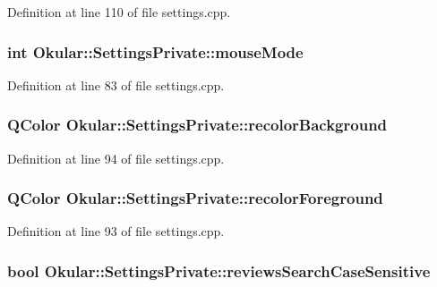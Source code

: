 Definition at line 110 of file settings.\+cpp.

\hypertarget{classOkular_1_1SettingsPrivate_a38b266f564e758f5a0634b3e56f4d7d6}{
\subsubsection[{mouse\+Mode}]{\setlength{\rightskip}{0pt plus 5cm}int Okular\+::\+Settings\+Private\+::mouse\+Mode}}\label{classOkular_1_1SettingsPrivate_a38b266f564e758f5a0634b3e56f4d7d6}


Definition at line 83 of file settings.\+cpp.

\hypertarget{classOkular_1_1SettingsPrivate_a4b7f7ebb712481217604970532e988f1}{
\subsubsection[{recolor\+Background}]{\setlength{\rightskip}{0pt plus 5cm}Q\+Color Okular\+::\+Settings\+Private\+::recolor\+Background}}\label{classOkular_1_1SettingsPrivate_a4b7f7ebb712481217604970532e988f1}


Definition at line 94 of file settings.\+cpp.

\hypertarget{classOkular_1_1SettingsPrivate_ac188f8afa6c36f3be06278295ef84d90}{
\subsubsection[{recolor\+Foreground}]{\setlength{\rightskip}{0pt plus 5cm}Q\+Color Okular\+::\+Settings\+Private\+::recolor\+Foreground}}\label{classOkular_1_1SettingsPrivate_ac188f8afa6c36f3be06278295ef84d90}


Definition at line 93 of file settings.\+cpp.

\hypertarget{classOkular_1_1SettingsPrivate_af7f4aa7572b8bc8a6a23c9b25785cfe0}{
\subsubsection[{reviews\+Search\+Case\+Sensitive}]{\setlength{\rightskip}{0pt plus 5cm}bool Okular\+::\+Settings\+Private\+::reviews\+Search\+Case\+Sensitive}}\label{classOkular_1_1SettingsPrivate_af7f4aa7572b8bc8a6a23c9b25785cfe0}


